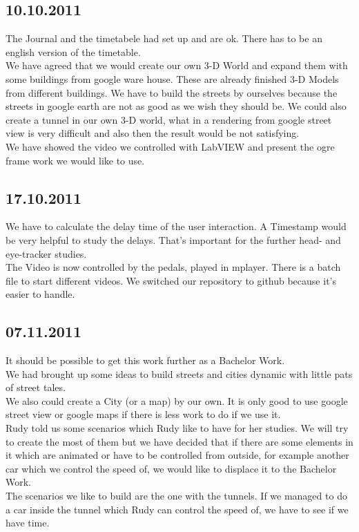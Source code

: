 \subsection*{10.10.2011}
The Journal and the timetabele had set up and are ok. There has to be an english version of the timetable. \\
We have agreed that we would create  our own 3-D World and expand them with some buildings from google ware house. These are already finished 3-D Models from different buildings. We have to build the streets by ourselves because the streets in google earth are not as good as we wish they should be. We could also create a tunnel in our own 3-D world, what in a rendering from google street view is very difficult and also then the result would be not satisfying. \\
We have showed the video we controlled with LabVIEW and present the ogre frame work we would like to use. 
\subsection*{17.10.2011}
We have to calculate the delay time of the user interaction. A Timestamp would be very helpful to study the delays. That's important for the further head- and eye-tracker studies. \\
The Video is now controlled by the pedals, played in mplayer.  There is a batch file to start different videos. 
We switched our repository to github because it's easier to handle.  
\subsection*{07.11.2011}
It should be possible to get this work further as a Bachelor Work.\\
We had brought up some ideas to build streets and cities dynamic with little pats of street tales. \\
We also could create a City (or a map) by our own. It is only good to use google street view or google maps if there is less work to do if we use it.\\
Rudy told us some scenarios which Rudy like to have for her studies. We will try to create the most of them but we have decided that if there are some elements in it which are animated or have to be controlled from outside, for example another car which we control the speed of, we would like to displace it to the Bachelor Work.  \\
The scenarios we like to build are the one with the tunnels. If we managed to do a car inside the tunnel which Rudy can control the speed of, we have to see if we have time. 
